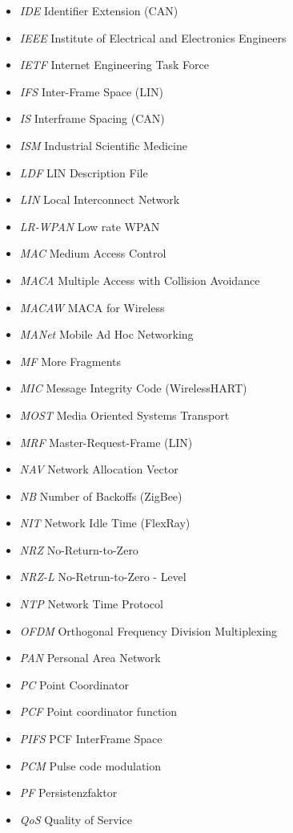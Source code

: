 \documentclass{article}
\begin{document}
\begin{itemize}
	\item \emph{IDE} Identifier Extension (CAN)
	\item \emph{IEEE} Institute of Electrical and Electronics Engineers
	\item \emph{IETF} Internet Engineering Task Force
	\item \emph{IFS} Inter-Frame Space (LIN)
	\item \emph{IS} Interframe Spacing (CAN)
	\item \emph{ISM} Industrial Scientific Medicine
	\item \emph{LDF} LIN Description File
	\item \emph{LIN} Local Interconnect Network
	\item \emph{LR-WPAN} Low rate WPAN
	\item \emph{MAC} Medium Access Control
	\item \emph{MACA} Multiple Access with Collision Avoidance
	\item \emph{MACAW} MACA for Wireless
	\item \emph{MANet} Mobile Ad Hoc Networking
	\item \emph{MF} More Fragments
	\item \emph{MIC} Message Integrity Code (WirelessHART)
	\item \emph{MOST} Media Oriented Systems Transport
	\item \emph{MRF} Master-Request-Frame (LIN)
	\item \emph{NAV} Network Allocation Vector
	\item \emph{NB} Number of Backoffs (ZigBee)
	\item \emph{NIT} Network Idle Time (FlexRay)
	\item \emph{NRZ} No-Return-to-Zero
	\item \emph{NRZ-L} No-Retrun-to-Zero - Level
	\item \emph{NTP} Network Time Protocol
	\item \emph{OFDM} Orthogonal Frequency Division Multiplexing
	\item \emph{PAN} Personal Area Network
	\item \emph{PC} Point Coordinator
	\item \emph{PCF} Point coordinator function
	\item \emph{PIFS} PCF InterFrame Space
	\item \emph{PCM} Pulse code modulation
	\item \emph{PF} Persistenzfaktor
	\item \emph{QoS} Quality of Service

\end{itemize}
\end{document}
